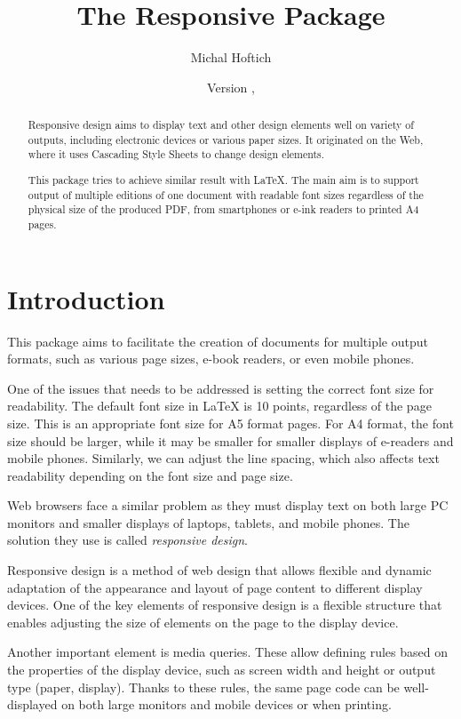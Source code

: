 \documentclass{ltxdoc}
\title{The Responsive Package}
\author{Michal Hoftich\authormail{michal.h21@gmail.com}}
\date{Version \version, \gitdate}
\begin{document}
\maketitle
\begin{abstract}
Responsive design aims to display text and other design elements well on
variety of outputs, including electronic devices or various paper sizes.
It originated on the Web, where it uses Cascading Style Sheets to change 
design elements. 

This package tries to achieve similar result with \LaTeX. The main aim is to 
support output of multiple editions of one document with 
readable font sizes regardless of the physical size of the produced PDF,
from smartphones or e-ink readers to printed A4 pages.
\end{abstract}

\clearpage

\tableofcontents

\section{Introduction}

This package aims to facilitate the creation of documents for multiple output
formats, such as various page sizes, e-book readers, or even mobile phones.

One of the issues that needs to be addressed is setting the correct font size
for readability. The default font size in LaTeX is 10 points, regardless of the
page size. This is an appropriate font size for A5 format pages. For A4 format,
the font size should be larger, while it may be smaller for smaller displays of
e-readers and mobile phones. Similarly, we can adjust the line spacing, which
also affects text readability depending on the font size and page size.

Web browsers face a similar problem as they must display text on both large PC
monitors and smaller displays of laptops, tablets, and mobile phones. The
solution they use is called \textit{responsive design}.

Responsive design is a method of web design that allows flexible and dynamic
adaptation of the appearance and layout of page content to different display
devices. One of the key elements of responsive design is a flexible structure
that enables adjusting the size of elements on the page to the display device.

Another important element is media queries. These allow defining rules based on
the properties of the display device, such as screen width and height or output
type (paper, display). Thanks to these rules, the same page code can be
well-displayed on both large monitors and mobile devices or when printing. 
\end{document}
